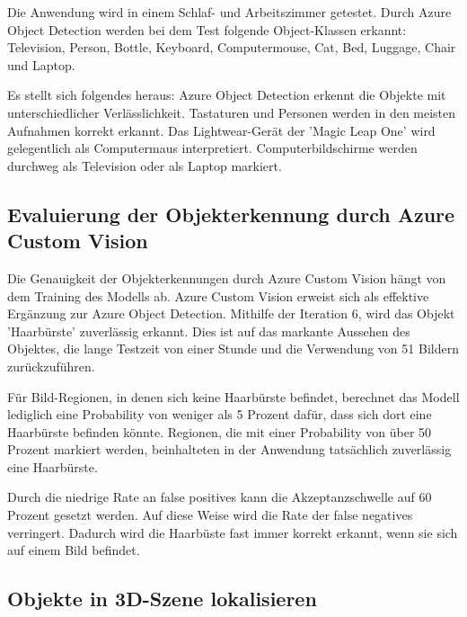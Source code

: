 Die Anwendung wird in einem Schlaf- und Arbeitszimmer getestet. Durch Azure Object Detection werden bei dem Test folgende Object-Klassen erkannt: Television, Person, Bottle, Keyboard, Computermouse, Cat, Bed, Luggage, Chair und Laptop.

Es stellt sich folgendes heraus: Azure Object Detection erkennt die Objekte mit unterschiedlicher Verlässlichkeit. Tastaturen und Personen werden in den meisten Aufnahmen korrekt erkannt. Das Lightwear-Gerät der 'Magic Leap One' wird gelegentlich als Computermaus interpretiert. Computerbildschirme werden durchweg als Television oder als Laptop markiert.

\subsection{Evaluierung der Objekterkennung durch Azure Custom Vision}

Die Genauigkeit der Objekterkennungen durch Azure Custom Vision hängt von dem Training des Modells ab. Azure Custom Vision erweist sich als effektive Ergänzung zur Azure Object Detection. Mithilfe der Iteration 6, wird das Objekt 'Haarbürste' zuverlässig erkannt. Dies ist auf das markante Aussehen des Objektes, die lange Testzeit von einer Stunde und die Verwendung von 51 Bildern zurückzuführen.

Für Bild-Regionen, in denen sich keine Haarbürste befindet, berechnet das Modell lediglich eine Probability von weniger als 5 Prozent dafür, dass sich dort eine Haarbürste befinden könnte. Regionen, die mit einer Probability von über 50 Prozent markiert werden, beinhalteten in der Anwendung tatsächlich zuverlässig eine Haarbürste.

Durch die niedrige Rate an false positives kann die Akzeptanzschwelle auf 60 Prozent gesetzt werden. Auf diese Weise wird die Rate der false negatives verringert. Dadurch wird die Haarbüste fast immer korrekt erkannt, wenn sie sich auf einem Bild befindet.

\subsection{Objekte in 3D-Szene lokalisieren}

